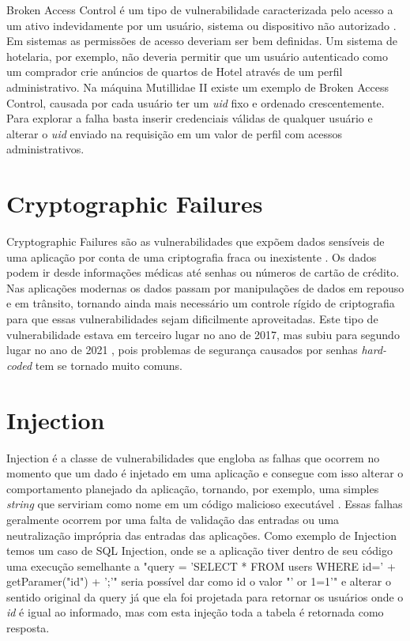Broken Access Control é um tipo de vulnerabilidade caracterizada pelo acesso a um ativo indevidamente por um usuário, sistema ou dispositivo não autorizado \cite{hassan2018quantitative}. Em sistemas as permissões de acesso deveriam ser bem definidas. Um sistema de hotelaria, por exemplo, não deveria permitir que um usuário autenticado como um comprador crie anúncios de quartos de Hotel através de um perfil administrativo. Na máquina Mutillidae II \cite{Jeremy2022} existe um exemplo de Broken Access Control, causada por cada usuário ter um \textit{uid} fixo e ordenado crescentemente. Para explorar a falha basta inserir credenciais válidas de qualquer usuário e alterar o \textit{uid} enviado na requisição em um valor de perfil com acessos administrativos.

\section{Cryptographic Failures}

Cryptographic Failures são as vulnerabilidades que expõem dados sensíveis de uma aplicação por conta de uma criptografia fraca ou inexistente \cite{nagoriquantum}. Os dados podem ir desde informações médicas até senhas ou números de cartão de crédito. Nas aplicações modernas os dados passam por manipulações de dados em repouso e em trânsito, tornando ainda mais necessário um controle rígido de criptografia para que essas vulnerabilidades sejam dificilmente aproveitadas. Este tipo de vulnerabilidade estava em terceiro lugar no ano de 2017, mas subiu para segundo lugar no ano de 2021 \cite{url:OWASP}, pois problemas de segurança causados por senhas \textit{hard-coded} tem se tornado muito comuns.

\section{Injection}

Injection é a classe de vulnerabilidades que engloba as falhas que ocorrem no momento que um dado é injetado em uma aplicação e consegue com isso alterar o comportamento planejado da aplicação, tornando, por exemplo, uma simples \textit{string} que serviriam como nome em um código malicioso executável \cite{9319139}. Essas falhas geralmente ocorrem por uma falta de validação das entradas ou uma neutralização imprópria das entradas das aplicações. Como exemplo de Injection temos um caso de SQL Injection, onde se a aplicação tiver dentro de seu código uma execução semelhante a "query = 'SELECT * FROM users WHERE id=' + getParamer("id") + ';'" seria possível dar como id o valor "' or 1=1'" e alterar o sentido original da query já que ela foi projetada para retornar os usuários onde o \textit{id} é igual ao informado, mas com esta injeção toda a tabela é retornada como resposta.

